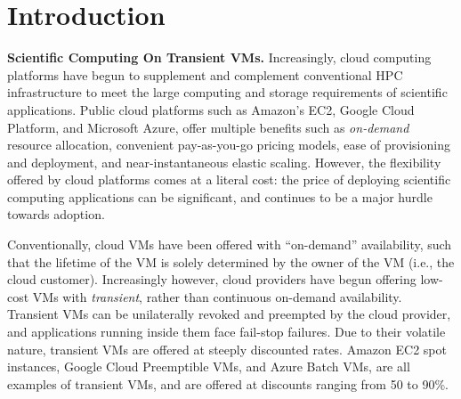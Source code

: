 \section{Introduction}
\label{sec:intro}








\noindent \textbf{Scientific Computing On Transient VMs.}
Increasingly, cloud computing platforms have begun to supplement and complement conventional HPC infrastructure to meet the large computing and storage requirements of scientific applications. Public cloud platforms such as Amazon's EC2, Google Cloud Platform, and Microsoft Azure, offer multiple benefits such as \emph{on-demand} resource allocation, convenient pay-as-you-go pricing models, ease of provisioning and deployment, and near-instantaneous elastic scaling. 
However, the flexibility offered by cloud platforms comes at a literal cost: the price of deploying scientific computing applications can be significant, and continues to be a major hurdle towards adoption. 


Conventionally, cloud VMs have been offered with ``on-demand'' availability, such that the lifetime of the VM is solely determined by the owner of the VM (i.e., the cloud customer). 
Increasingly however, cloud providers have begun offering low-cost VMs with \emph{transient}, rather than continuous on-demand availability. 
Transient VMs can be unilaterally revoked and preempted by the cloud provider, and applications running inside them face fail-stop failures. 
Due to their volatile nature, transient VMs are offered at steeply discounted rates. Amazon EC2 spot instances, Google Cloud Preemptible VMs, and Azure Batch VMs, are all examples of transient VMs, and are offered at discounts ranging from 50 to 90\%.  


